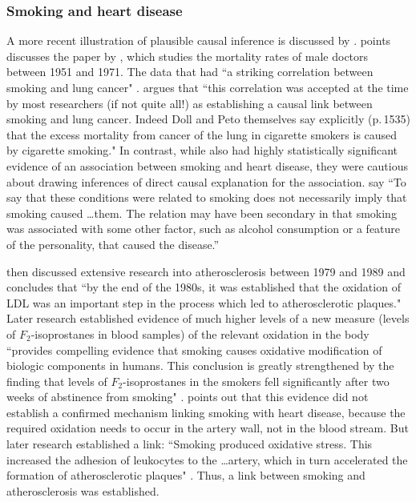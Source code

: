 \documentclass[11pt]{amsart}
\begin{document}
\subsubsection{Smoking and heart disease}
A more recent illustration of plausible causal inference is discussed by \citet{Gillies2011-GILTRT-3}.
 \citet{Gillies2011-GILTRT-3} points discusses the paper by \citet{Doll:1976aa}, which studies the mortality rates of male doctors between 1951 and 1971.
 The data that \citet{Doll:1976aa} had ``a striking correlation between smoking and lung cancer" \citep[p.\,111]{Gillies2011-GILTRT-3}.
 \citet{Gillies2011-GILTRT-3} argues that ``this correlation was accepted at the time by most researchers (if not quite all!) as establishing a causal link between smoking and lung cancer. Indeed Doll and Peto themselves say explicitly (p.\,1535) that the excess mortality from cancer of the lung in cigarette smokers is caused by cigarette smoking."
In contrast, while \citet{Doll:1976aa} also had highly statistically significant evidence of an association between smoking and heart disease, they were cautious about drawing inferences of direct causal explanation for the association.
\citet[p.\,1528]{Doll:1976aa} say ``To say that these conditions were related to smoking does not necessarily imply that smoking caused \dots them. The relation may have been secondary in that smoking was associated with some other factor, such as alcohol consumption or a feature of the personality, that caused the disease.''
 
 \citet{Gillies2011-GILTRT-3} then discussed extensive research into atherosclerosis between 1979 and 1989 and concludes that ``by the end of the 1980s, it was established that the oxidation of LDL was an important step in the process which led to atherosclerotic plaques."  Later research established evidence of much higher levels of a new measure (levels of $F_2$-isoprostanes in blood samples) of the relevant oxidation in the body ``provides compelling evidence that smoking causes oxidative modification of biologic components in humans. This conclusion is greatly strengthened by the finding that levels of $F_2$-isoprostanes in the smokers fell significantly after two weeks of abstinence from smoking" \citep[pp.\,1201--2]{Morrow:1995gz}.  \citet[p.\,120]{Gillies2011-GILTRT-3} points out that this evidence did not establish a confirmed mechanism linking smoking with heart disease, because the required oxidation needs to occur in the artery wall, not in the blood stream. But later research established a link: ``Smoking produced oxidative stress. This increased the adhesion of leukocytes to the \dots artery, which in turn accelerated the formation of atherosclerotic plaques" \citep[p.\,123]{Gillies2011-GILTRT-3}.
Thus, a link between smoking and atherosclerosis was established.
\end{document}
